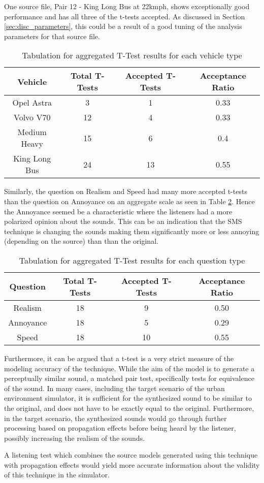 One source file, Pair 12 - King Long Bus at 22kmph, shows exceptionally good performance and has all three of the t-tests accepted. As discussed in Section \ref{sec:disc_parameters}, this could be a result of a good tuning of the analysis parameters for that source file.

\begin{table}[ht]
\begin{center}
\begin{tabular}{| c | c | c | c |}
\hline
Vehicle & Total T-Tests & Accepted T-Tests & Acceptance Ratio \\
\hline
Opel Astra & 3 & 1 & 0.33 \\
Volvo V70 & 12 & 4 & 0.33\\
Medium Heavy & 15 & 6 & 0.4\\
King Long Bus & 24 & 13 & 0.55\\
\hline
\end{tabular}
\caption{Tabulation for aggregated T-Test results for each vehicle type}
\label{tab:ttest_aggregate_vehicle}
\end{center}
\end{table}

Similarly, the question on Realism and Speed had many more accepted t-tests than the question on Annoyance on an aggregate scale as seen in Table \ref{tab:ttest_aggregate_test}. Hence the Annoyance seemed be a characteristic where the listeners had a more polarized opinion about the sounds. This can be an indication that the SMS technique is changing the sounds making them significantly more or less annoying (depending on the source) than than the original.

\begin{table}[ht]
\begin{center}
\begin{tabular}{| c | c | c | c |}
\hline
Question & Total T-Tests & Accepted T-Tests & Acceptance Ratio \\
\hline
Realism & 18 & 9 & 0.50 \\
Annoyance & 18 & 5 & 0.29\\
Speed & 18 & 10 & 0.55\\
\hline
\end{tabular}
\caption{Tabulation for aggregated T-Test results for each question type}
\label{tab:ttest_aggregate_test}
\end{center}
\end{table}

Furthermore, it can be argued that a t-test is a very strict measure of the modeling accuracy of the technique. While the aim of the model is to generate a perceptually similar sound, a matched pair test, specifically tests for equivalence of the sound. In many cases, including the target scenario of the urban environment simulator, it is sufficient for the synthesized sound to be similar to the original, and does not have to be exactly equal to the original. Furthermore, in the target scenario, the synthesized sounds would go through further processing based on propagation effects before being heard by the listener, possibly increasing the realism of the sounds. 

A listening test which combines the source models generated using this technique with propagation effects would yield more accurate information about the validity of this technique in the simulator.